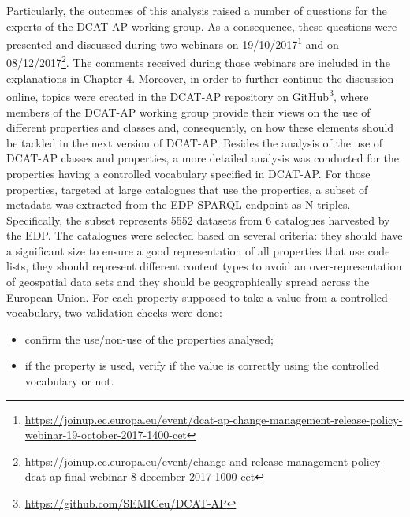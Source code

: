 \documentclass[<options>]{elsarticle}
\begin{document}
Particularly, the outcomes of this analysis raised a number of questions for the experts of the DCAT-AP working group. As a consequence, these questions were presented and discussed during two webinars on 19/10/2017\footnote{\href{ https://joinup.ec.europa.eu/event/dcat-ap-change-management-release-policy-webinar-19-october-2017-1400-cet}{ https://joinup.ec.europa.eu/event/dcat-ap-change-management-release-policy-webinar-19-october-2017-1400-cet}} and on 08/12/2017\footnote{\href{ https://joinup.ec.europa.eu/event/change-and-release-management-policy-dcat-ap-final-webinar-8-december-2017-1000-cet}{ https://joinup.ec.europa.eu/event/change-and-release-management-policy-dcat-ap-final-webinar-8-december-2017-1000-cet}}. The comments received during those webinars are included in the explanations in Chapter 4. Moreover, in order to further continue the discussion online, topics were created in the DCAT-AP repository on GitHub\footnote{\href{  https://github.com/SEMICeu/DCAT-AP}{  https://github.com/SEMICeu/DCAT-AP}}, where members of the DCAT-AP working group provide their views on the use of different properties and classes and, consequently, on how these elements should be tackled in the next version of DCAT-AP.
Besides the analysis of the use of DCAT-AP classes and properties, a more detailed analysis was conducted for the properties having a controlled vocabulary specified in DCAT-AP. For those properties, targeted at large catalogues that use the properties, a subset of metadata was extracted from the EDP SPARQL endpoint as N-triples. Specifically, the subset represents 5552 datasets from 6 catalogues harvested by the EDP. The catalogues were selected based on several criteria: they should have a significant size to ensure a good representation of all properties that use code lists, they should represent different content types to avoid an over-representation of geospatial data sets and they should be geographically spread across the European Union. For each property supposed to take a value from a controlled vocabulary, two validation checks were done:

\begin{itemize}
\item confirm the use/non-use of the properties analysed;
\item if the property is used, verify if the value is correctly using the controlled vocabulary or not.
\end{itemize}
\end{document}
